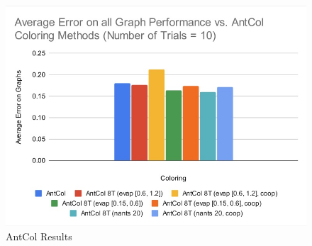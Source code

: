 \documentclass[runningheads]{llncs}
\begin{document}
\begin{figure}[h]
  \centering
  \includegraphics[width=1\textwidth]{AntCol.png}
  \caption{AntCol Results}
  \label{fig:antcol}
\end{figure}


\clearpage

\printbibliography
\end{document}

